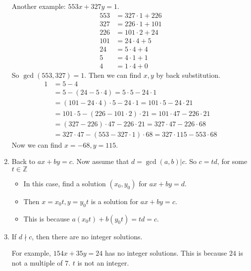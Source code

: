 \documentclass[letterpaper,12pt,oneside]{article}
\begin{document}
\begin{enumerate}
          Another example: $553x+327y=1$. \begin{align*}
              553 & = 327 \cdot 1 + 226 \\
              327 & = 226 \cdot 1 + 101 \\
              226 & = 101 \cdot 2 + 24  \\
              101 & = 24 \cdot 4 + 5    \\
              24  & = 5 \cdot 4 + 4     \\
              5   & = 4 \cdot 1 + 1     \\
              4   & = 1 \cdot 4 + 0
          \end{align*}
          So $\gcd(553, 327) = 1$. Then we can find $x, y$ by back substitution.
          \begin{align*}
              1 & = 5 - 4                                                                      \\
                & = 5 - (24 - 5 \cdot 4) = 5 \cdot 5  - 24 \cdot 1                             \\
                & = (101 - 24 \cdot 4) \cdot 5 - 24 \cdot 1 = 101 \cdot 5 - 24 \cdot 21        \\
                & = 101 \cdot 5 - (226 - 101 \cdot 2) \cdot 21 = 101 \cdot 47 - 226 \cdot 21   \\
                & = (327 - 226) \cdot 47 - 226 \cdot 21 = 327 \cdot 47 - 226 \cdot 68          \\
                & = 327 \cdot 47 - (553 - 327 \cdot 1) \cdot 68 = 327 \cdot 115 - 553 \cdot 68
          \end{align*}
          Now we can find $x = -68, y = 115$.

    \item Back to $ax+by=c$. Now assume that $d= \gcd(a,b) | c$. So $c = td$, for some
          $t\in \mathbb{Z}$ \begin{itemize}
              \item In this case, find a solution $(x_0, y_0)$ for $ax+by=d$.
              \item Then $x = x_0t, y = y_0t$ is a solution for $ax+by=c$.
              \item This is because $a(x_0t) + b(y_0t) = td = c$.
          \end{itemize}
    \item If $d \nmid c$, then there are no integer solutions.

          For example, $154x+35y=24$ has no integer solutions. This is because $24$ is
          not a multiple of $7$. $t$ is not an integer.


\end{enumerate}
\end{document}
